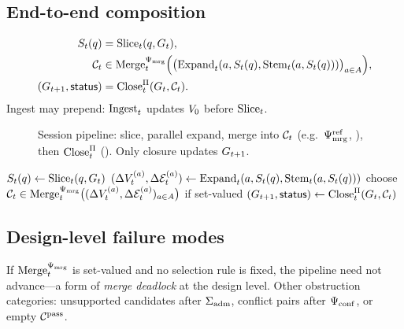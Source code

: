 \subsection{End-to-end composition}
\label{sec:compose}

\begin{align}
  S_t(q) &= \mathrm{Slice}_t(q,G_t), \\
  \mathcal{C}_t &\in \mathrm{Merge}_t^{\Psi_{\mathrm{mrg}}}\Bigl(\bigl(\mathrm{Expand}_t(a,S_t(q),\mathrm{Stem}_t(a,S_t(q)))\bigr)_{a\in A}\Bigr), \\
  (G_{t+1},\mathsf{status}) &= \mathrm{Close}_t^{\Pi}(G_t,\mathcal{C}_t).
\end{align}
Ingest may prepend: $\mathrm{Ingest}_t$ updates $V_{0}$ before $\mathrm{Slice}_t$.

\begin{figure}[t]
  \centering
  
  \caption{Session pipeline: slice, parallel expand, merge into $\mathcal{C}_t$ (e.g.\ $\Psi_{\mathrm{mrg}}^{\mathrm{ref}}$, ), then $\mathrm{Close}_t^{\Pi}$ (). Only closure updates $G_{t+1}$.}
  \label{fig:pipeline}
\end{figure}

\begin{algorithm}[t]
  \caption{Session update at $t$ for query $q$ (policy-relative)}
  \label{alg:main}
  \begin{algorithmic}[1]
    \State $S_t(q) \gets \mathrm{Slice}_t(q,G_t)$
      \State $(\Delta V^{(a)}_t,\Delta \mathcal{E}^{(a)}_t) \gets \mathrm{Expand}_t(a,S_t(q),\mathrm{Stem}_t(a,S_t(q)))$
    \EndFor
    \State choose $\mathcal{C}_t \in \mathrm{Merge}_t^{\Psi_{\mathrm{mrg}}}\bigl((\Delta V^{(a)}_t,\Delta \mathcal{E}^{(a)}_t)_{a\in A}\bigr)$ if set-valued
    \State $(G_{t+1},\mathsf{status}) \gets \mathrm{Close}_t^{\Pi}(G_t,\mathcal{C}_t)$
  \end{algorithmic}
\end{algorithm}

\subsection{Design-level failure modes}
\label{sec:failure-modes}

If $\mathrm{Merge}_t^{\Psi_{\mathrm{mrg}}}$ is set-valued and no selection rule is fixed, the pipeline need not advance---a form of \emph{merge deadlock} at the design level.
Other obstruction categories: unsupported candidates after $\Sigma_{\mathrm{adm}}$, conflict pairs after $\Psi_{\mathrm{conf}}$, or empty $\mathcal{C}^{\mathrm{pass}}$.
